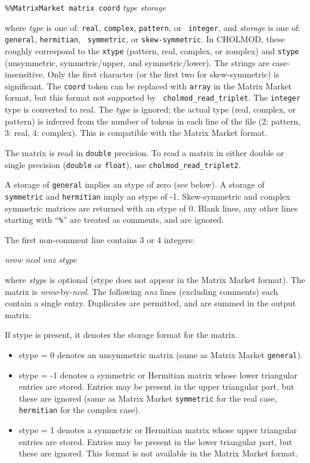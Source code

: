 \documentclass[11pt]{article}
\begin{document}
        {\tt \%\%MatrixMarket matrix coord} {\em type storage}

\vspace{0.1in}
\noindent
where {\em type} is one of: {\tt real}, {\tt complex}, {\tt pattern}, or {\tt
integer}, and {\em storage} is one of: {\tt general}, {\tt hermitian}, {\tt
symmetric}, or {\tt skew-symmetric}.  In CHOLMOD, these roughly correspond to
the {\tt xtype} (pattern, real, complex, or zomplex) and {\tt stype}
(unsymmetric, symmetric/upper, and symmetric/lower).  The strings are
case-insensitive.  Only the first character (or the first two for
skew-symmetric) is significant.  The {\tt coord} token can be replaced with
{\tt array} in the Matrix Market format, but this format not supported by {\tt
cholmod\_read\_triplet}.  The {\tt integer} type is converted to real.  The
{\em type} is ignored; the actual type (real, complex, or pattern) is inferred
from the number of tokens in each line of the file (2: pattern, 3: real, 4:
complex).  This is compatible with the Matrix Market format.

The matrix is read in {\tt double} precision.  To read a matrix
in either double or single precision ({\tt double} or {\tt float}),
use \verb'cholmod_read_triplet2'.

A storage of {\tt general} implies an stype of zero (see below).  A storage of
{\tt symmetric} and {\tt hermitian} imply an stype of -1.  Skew-symmetric and
complex symmetric matrices are returned with an stype of 0.  Blank lines, any
other lines starting with ``{\tt \%}'' are treated as comments, and are
ignored.

The first non-comment line contains 3 or 4 integers:
\vspace{0.1in}

        {\em nrow ncol nnz stype}

\vspace{0.1in}
\noindent
where {\em stype} is optional (stype does not appear in the Matrix Market
format).  The matrix is {\em nrow}-by-{\em ncol}.  The following {\em nnz}
lines (excluding comments) each contain a single entry.  Duplicates are
permitted, and are summed in the output matrix.

If stype is present, it denotes the storage format for the matrix.
\begin{itemize}
\item stype = 0 denotes an unsymmetric matrix (same as Matrix Market {\tt general}).
\item stype = -1 denotes a symmetric or Hermitian matrix whose lower triangular
        entries are stored.  Entries may be present in the upper triangular
        part, but these are ignored (same as Matrix Market {\tt symmetric}
        for the real case, {\tt hermitian} for the complex case).
\item stype = 1 denotes a symmetric or Hermitian matrix whose upper triangular
        entries are stored.  Entries may be present in the lower triangular
        part, but these are ignored.  This format is not available in the Matrix
        Market format.
\end{itemize}
\end{document}
